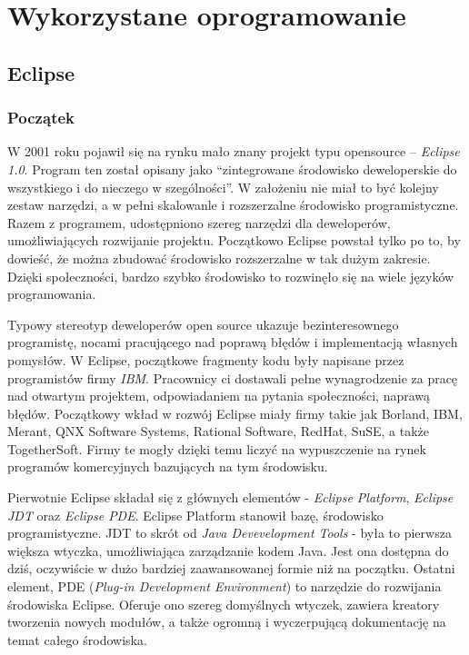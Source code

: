 \chapter{Wykorzystane oprogramowanie}
\section{Eclipse}
\subsection{Początek}
W 2001 roku pojawił się na rynku mało znany projekt typu opensource – \emph{Eclipse 1.0}. Program ten został opisany jako “zintegrowane środowisko deweloperskie do wszystkiego i do nieczego w szególności”. W założeniu nie miał to być kolejny zestaw narzędzi, a w pełni skalowanle i rozszerzalne środowisko programistyczne. Razem z programem, udostępniono szereg narzędzi dla deweloperów, umożliwiających rozwijanie projektu. Początkowo Eclipse powstał tylko po to, by dowieść, że można zbudować środowisko rozszerzalne w tak dużym zakresie. Dzięki społeczności, bardzo szybko środowisko to rozwinęło się na wiele języków programowania.

Typowy stereotyp deweloperów open source ukazuje bezinteresownego programistę, nocami pracującego nad poprawą błędów i implementacją własnych pomysłów. W Eclipse, początkowe fragmenty kodu były napisane przez programistów firmy \emph{IBM}. Pracownicy ci dostawali pełne wynagrodzenie za pracę nad otwartym projektem, odpowiadaniem na pytania społeczności, naprawą błędów. Początkowy wkład w rozwój Eclipse miały firmy takie jak Borland, IBM, Merant, QNX Software Systems, Rational Software, RedHat, SuSE, a także TogetherSoft. Firmy te mogły dzięki temu liczyć na wypuszczenie na rynek programów komercyjnych bazujących na tym środowisku. 

Pierwotnie Eclipse składał się z głównych elementów - \emph{Eclipse Platform}, \emph{Eclipse JDT} oraz \emph{Eclipse PDE}. Eclipse Platform stanowił bazę, środowisko programistyczne. JDT to skrót od \emph{Java Devevelopment Tools} - była to pierwsza większa wtyczka, umożliwiająca zarządzanie kodem Java. Jest ona dostępna do dziś, oczywiście w dużo bardziej zaawansowanej formie niż na początku. Ostatni element, PDE (\emph{Plug-in Development Environment}) to narzędzie do rozwijania środowiska Eclipse. Oferuje ono szereg domyślnych wtyczek, zawiera kreatory tworzenia nowych modułów, a także ogromną i wyczerpującą dokumentację na temat całego środowiska.


